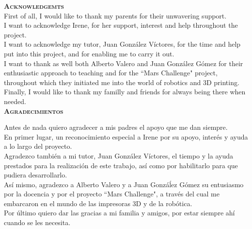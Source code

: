 \vspace*{2cm}
\color{part} \textsc{\Large \textbf{Acknowledgemts}}\\[0.5cm]
\color{black}
First of all, I would like to thank my parents for their unwavering support.\\

I want to acknowledge Irene, for her support, interest and help throughout the project.\\

I want to acknowledge my tutor, Juan González Víctores, for the time and help put into this project, and for enabling me to carry it out.\\

I want to thank as well both Alberto Valero and Juan González Gómez for their enthusiastic approach to teaching and for the ``Mars Challenge" project, throughout which they initiated me into the world of robotics and 3D printing.\\

Finally, I would like to thank my familly and friends for always being there when needed.\\[1cm]

\vspace*{1cm}
\color{part} \textsc{\Large \textbf{Agradecimientos}}\\[0.5cm]
\color{black}

Antes de nada quiero agradecer a mis padres el apoyo que me dan siempre. \\

En primer lugar, un reconocimiento especial a Irene por su apoyo, interés y ayuda a lo largo del proyecto.\\

Agradezco también a mi tutor, Juan González Víctores, el tiempo y la ayuda prestados para la realización de este trabajo, así como por habilitarlo para que pudiera desarrollarlo.\\

Así mismo, agradezco a Alberto Valero y a Juan Gonzáĺez Gómez su entusiasmo por la docencia y por el proyecto ``Mars Challenge", a través del cual me embarcaron en el mundo de las impresoras 3D y de la robótica.\\

Por último quiero dar las gracias a mi familia y amigos, por estar siempre ahí cuando se les necesita.
























































\color{black}

